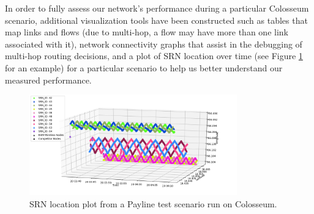 \documentclass[11pt]{article}
\begin{document}
\begin{enumerate}
     In order to fully assess our network's performance during a particular Colosseum scenario, additional visualization tools have been constructed such as tables that map links and flows (due to multi-hop, a flow may have more than one link associated with it), network connectivity graphs that assist in the debugging of multi-hop routing decisions, and a plot of SRN location over time (see Figure \ref{fg:Loc} for an example) for a particular scenario to help us better understand our measured performance.
     \begin{figure} [htb]
     \centerline{
     \includegraphics[width = 0.8\textwidth]{Figures/Payline_24Nov2018_LocationPlot.png}}
     \caption{SRN location plot from a Payline test scenario run on Colosseum.}
     \label{fg:Loc}
     \end{figure}
     

\end{enumerate}
\end{document}
